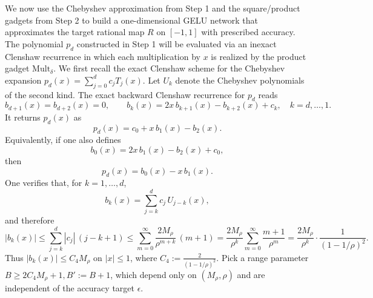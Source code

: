 \documentclass{article}
\theoremstyle{plain}
\theoremstyle{definition}
\theoremstyle{remark}
\begin{document}
We now use the Chebyshev approximation from Step 1 and the square/product gadgets from Step 2 to build a one-dimensional GELU network that approximates the target rational map $R$ on $[-1,1]$ with prescribed accuracy. The polynomial $p_d$ constructed in Step 1 will be evaluated via an inexact Clenshaw recurrence in which each multiplication by $x$ is realized by the product gadget $\mathrm{Mult}_\delta$. We first recall the exact Clenshaw scheme for the Chebyshev expansion \(p_d(x)=\sum_{j=0}^d c_j T_j(x)\). Let $U_k$ denote the Chebyshev polynomials of the second kind. The exact backward Clenshaw recurrence for $p_d$ reads
\[
b_{d+1}(x)=b_{d+2}(x)=0,\qquad
b_k(x)=2x\,b_{k+1}(x)-b_{k+2}(x)+c_k,\quad k=d,\dots,1.
\]
It returns $p_d(x)$ as
\[
p_d(x)=c_0+x\,b_1(x)-b_2(x).
\]
Equivalently, if one also defines
\[
b_0(x)=2x\,b_1(x)-b_2(x)+c_0,
\]
then
\[
p_d(x)=b_0(x)-x\,b_1(x).
\]
One verifies that, for $k=1,\dots,d$,
\[
b_k(x)=\sum_{j=k}^d c_j\,U_{j-k}(x),
\]
and therefore
\[
|b_k(x)|\le \sum_{j=k}^d |c_j|\,(j-k+1)\le \sum_{m=0}^{\infty} \frac{2M_\rho}{\rho^{m+k}}\,(m+1)
= \frac{2M_\rho}{\rho^{k}}\sum_{m=0}^{\infty}\frac{m+1}{\rho^{m}}
= \frac{2M_\rho}{\rho^{k}}\cdot\frac{1}{(1-1/\rho)^2}.
\]
Thus $|b_k(x)|\le C_4 M_\rho$ on $|x|\le 1$, where \(C_4:=\frac{2}{(1-1/\rho)^2}\). Pick a range parameter \(B\ge 2C_4 M_\rho+1, B':=B+1\), which depend only on $(M_\rho,\rho)$ and are independent of the accuracy target $\epsilon$.
\end{document}
